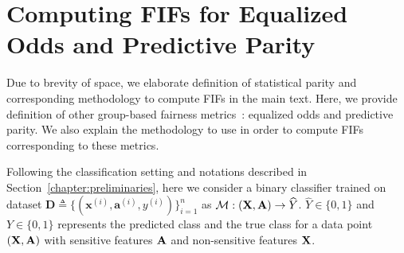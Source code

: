 \section{Computing FIFs for Equalized Odds and Predictive Parity}\label{fairness_fairXplainer_app:pp}
Due to brevity of space, we elaborate definition of statistical parity and corresponding methodology to compute FIFs in the main text. Here, we provide definition of other group-based fairness metrics~\cite{verma2018fairness}: equalized odds and predictive parity. We also explain the methodology to use {\fairXplainer} in order to compute FIFs corresponding to these metrics.

Following the classification setting and notations described in Section~\ref{chapter:preliminaries}, here we consider a binary classifier trained on dataset $\mathbf{D}\triangleq \{(\mathbf{x}^{(i)}, \mathbf{a}^{(i)}, y^{(i)})\}_{i=1}^n$ as $\mathcal{M}: (\mathbf{X}, \mathbf{A}) \rightarrow \widehat{Y} $. $\widehat{Y} \in \{0,1\}$ and ${Y} \in \{0,1\}$ represents the predicted class and the true class for a data point $ (\mathbf{X}, \mathbf{A}) $ with sensitive features $\mathbf{A}$ and non-sensitive features $\mathbf{X}$.


